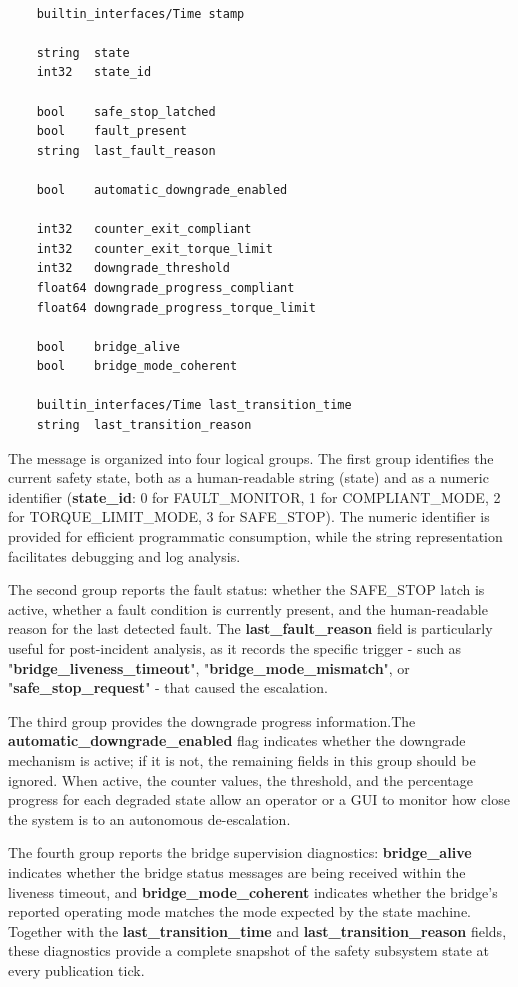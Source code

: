 \begin{verbatim}

    builtin_interfaces/Time stamp

    string  state
    int32   state_id

    bool    safe_stop_latched
    bool    fault_present
    string  last_fault_reason

    bool    automatic_downgrade_enabled

    int32   counter_exit_compliant
    int32   counter_exit_torque_limit
    int32   downgrade_threshold
    float64 downgrade_progress_compliant
    float64 downgrade_progress_torque_limit

    bool    bridge_alive
    bool    bridge_mode_coherent

    builtin_interfaces/Time last_transition_time
    string  last_transition_reason

\end{verbatim}

The message is organized into four logical groups. The first group identifies the current safety state, both as a human-readable string (state) and as a numeric identifier (\textbf{state\_id}: 0 for FAULT\_MONITOR, 1 for COMPLIANT\_MODE, 2 for TORQUE\_LIMIT\_MODE, 3 for SAFE\_STOP). The numeric identifier is provided for efficient programmatic consumption, while the string representation facilitates debugging and log analysis.

The second group reports the fault status: whether the SAFE\_STOP latch is active, whether a fault condition is currently present, and the human-readable reason for the last detected fault. The \textbf{last\_fault\_reason} field is particularly useful for post-incident analysis, as it records the specific trigger - such as \newline "\textbf{bridge\_liveness\_timeout}", "\textbf{bridge\_mode\_mismatch}", or \newline"\textbf{safe\_stop\_request}" - that caused the escalation.

The third group provides the downgrade progress information.\newline The \textbf{automatic\_downgrade\_enabled} flag indicates whether the downgrade mechanism is active; if it is not, the remaining fields in this group should be ignored. When active, the counter values, the threshold, and the percentage progress for each degraded state allow an operator or a GUI to monitor how close the system is to an autonomous de-escalation.

The fourth group reports the bridge supervision diagnostics: \textbf{bridge\_alive} indicates whether the bridge status messages are being received within the liveness timeout, and \textbf{bridge\_mode\_coherent} indicates whether the bridge's reported operating mode matches the mode expected by the state machine. Together with the \textbf{last\_transition\_time} and \textbf{last\_transition\_reason} fields, these diagnostics provide a complete snapshot of the safety subsystem state at every publication tick.

